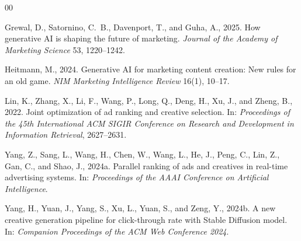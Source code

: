 \documentclass[preprint,12pt]{elsarticle}
\begin{document}

\begin{thebibliography}{00}

Grewal, D., Satornino, C.~B., Davenport, T., and Guha, A., 2025. How generative AI is shaping the future of marketing. \textit{Journal of the Academy of Marketing Science} 53, 1220--1242.

Heitmann, M., 2024. Generative AI for marketing content creation: New rules for an old game. \textit{NIM Marketing Intelligence Review} 16(1), 10--17.

Lin, K., Zhang, X., Li, F., Wang, P., Long, Q., Deng, H., Xu, J., and Zheng, B., 2022. Joint optimization of ad ranking and creative selection. In: \textit{Proceedings of the 45th International ACM SIGIR Conference on Research and Development in Information Retrieval}, 2627--2631.

Yang, Z., Sang, L., Wang, H., Chen, W., Wang, L., He, J., Peng, C., Lin, Z., Gan, C., and Shao, J., 2024a. Parallel ranking of ads and creatives in real-time advertising systems. In: \textit{Proceedings of the AAAI Conference on Artificial Intelligence}.

Yang, H., Yuan, J., Yang, S., Xu, L., Yuan, S., and Zeng, Y., 2024b. A new creative generation pipeline for click-through rate with Stable Diffusion model. In: \textit{Companion Proceedings of the ACM Web Conference 2024}.

\end{thebibliography}
\end{document}
